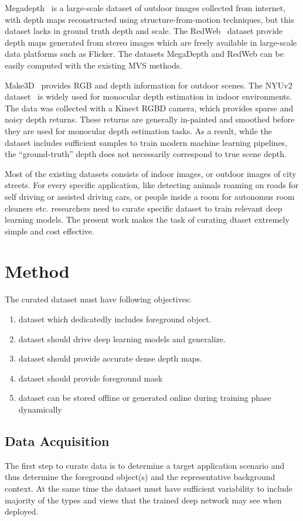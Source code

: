 \documentclass[review]{cvpr}
\begin{document}
Megadepth~\cite{li2018megadepth} is a large-scale dataset of outdoor images collected from internet, with depth maps reconstructed 
using structure-from-motion techniques, but this dataset lacks in ground truth depth and scale. The RedWeb~\cite{xian2018monocular}
dataset provide depth maps generated from stereo images which are freely available in large-scale data platforms such as Flicker. 
The datasets MegaDepth and RedWeb can be easily computed with the existing MVS methods.

Make3D~\cite{saxena2008make3d} provides RGB and depth information for outdoor scenes. 
The NYUv2 dataset~\cite{silberman2012indoor} is widely used for monocular depth estimation in indoor environments. 
The data was collected with a Kinect RGBD camera, which provides sparse and noisy depth returns. 
These returns are generally in-painted and smoothed before they are used for monocular depth estimation tasks. 
As a result, while the dataset includes sufficient samples to train modern machine learning pipelines,
the “ground-truth” depth does not necessarily correspond to true scene depth.

Most of the existing datasets consists of indoor images, or outdoor images of city streets. For every specific application, like
detecting animals roaming on roads for self driving or assisted driving cars, or people inside a room for autonomus room cleaners etc.
researchers need to curate specific dataset to train relevant deep learning models. The present work makes the task of 
curating dtaset extremely simple and cost effective.

\section{Method}
The curated dataset must have following objectives:
\begin{enumerate}
\item dataset which dedicatedly includes foreground object. 
\item dataset should drive deep learning models and generalize. 
\item dataset should provide accurate dense depth maps.
\item dataset should provide foreground mask
\item dataset can be stored offline or generated online during training phase dynamically
\end{enumerate}

\subsection{Data Acquisition}
The first step to curate data is to determine a target application scenario and thus determine the foreground object(s) and the
representative background context. At the same time the dataset must have sufficient variability to include majority of
the types and views that the trained deep network may see when deployed.
\end{document}
